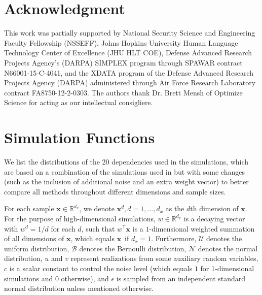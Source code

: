 \documentclass[11pt]{article}
\newcommand{\note}[2][]{\added[#1,remark={#2}]{}}
\providecommand{\sct}[1]{{\sc \texttt{#1}}}
\providecommand{\mb}[1]{\boldsymbol{#1}}
\providecommand{\mc}[1]{\mathcal{#1}}
\newcommand{\Real}{\mathbb{R}}
\newcommand{\T}{^{\ensuremath{\mathsf{T}}}}           %
\newcommand{\Mgc}{\sct{Mgc}}
\newcommand{\cs}[1]{{\note{cs: #1}}}
\newcommand{\mbx}{\ensuremath{\mb{x}}}
\begin{document}






\section*{Acknowledgment}
This work was partially supported by
%
National Security Science and Engineering Faculty Fellowship (NSSEFF),
%
Johns Hopkins University Human Language Technology Center of Excellence (JHU HLT COE),
%
Defense Advanced Research Projects Agency's (DARPA) SIMPLEX program through SPAWAR contract N66001-15-C-4041,
%
and the XDATA program of the Defense Advanced Research Projects Agency (DARPA) administered through Air Force Research Laboratory contract FA8750-12-2-0303. The authors thank Dr. Brett Mensh of Optimize Science for acting as our intellectual consigliere.


\clearpage
\appendix
\setcounter{figure}{0}
\renewcommand\thefigure{A\arabic{figure}}

\section{Simulation Functions}
\label{appen:function}

We list the distributions of the $20$ dependencies used in the simulations, which are based on a combination of the simulations used in \cite{SzekelyRizzoBakirov2007, SimonTibshirani2012, SimonTibshirani2012, GorfineHellerHeller2012} but with some changes (such as the inclusion of additional noise and an extra weight vector) to better compare all methods throughout different dimensions and sample sizes.

For each sample $\mbx \in \Real^{d_{x}}$, we denote $\mbx^{d}, d=1,\ldots,d_{x}$ as the $d$th dimension of \mbx. For the purpose of high-dimensional simulations, $w \in \Real^{d_{x}}$ is a decaying vector with $w^{d}=1/d$ for each $d$, such that $w\T \mbx$ is a $1$-dimensional weighted summation of all dimensions of \mbx, which equals \mbx~if $d_{x}=1$.
Furthermore, $\mc{U}$ denotes the uniform distribution, $\mc{B}$ denotes the Bernoulli distribution, $\mc{N}$ denotes the normal distribution, $u$ and $v$ represent realizations from some auxiliary random variables, $c$ is a scalar constant to control the noise level (which equals $1$ for 1-dimensional simulations and $0$ otherwise), and $\epsilon$ is sampled from an independent standard normal distribution unless mentioned otherwise.
\end{document}
